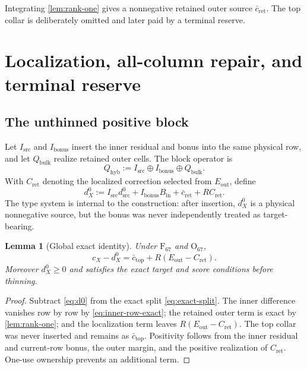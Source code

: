 \documentclass[11pt]{article}
\newtheorem{lemma}[theorem]{Lemma}
\theoremstyle{definition}
\theoremstyle{remark}
\newcommand{\1}{\mathbf 1}
\begin{document}
Integrating \cref{lem:rank-one} gives a nonnegative retained outer source \(\bar c_{\mathrm{ret}}\).  The top collar is deliberately omitted and later paid by a terminal reserve.

\section{Localization, all-column repair, and terminal reserve}\label{sec:localization}

\subsection{The unthinned positive block}

Let \(I_{\mathrm{src}}\) and \(I_{\mathrm{bonus}}\) insert the inner residual and bonus into the same physical row, and let \(Q_{\mathrm{bulk}}\) realize retained outer cells.  The block operator is
\begin{equation}\label{eq:Qhyb}
Q_{\mathrm{hyb}}:=I_{\mathrm{src}}\oplus I_{\mathrm{bonus}}\oplus Q_{\mathrm{bulk}}.
\end{equation}
With \(C_{\mathrm{ret}}\) denoting the localized correction selected from \(E_{\mathrm{out}}\), define
\begin{equation}\label{eq:d0}
d_X^0:=I_{\mathrm{src}}d_{\mathrm{src}}^0+I_{\mathrm{bonus}}B_{\mathrm{in}}
       +\bar c_{\mathrm{ret}}+RC_{\mathrm{ret}}.
\end{equation}
The type system is internal to the construction: after insertion, \(d_X^0\) is a physical nonnegative source, but the bonus was never independently treated as target-bearing.

\begin{lemma}[Global exact identity]\label{lem:global-exact}
Under \(\mathrm F_{67}\) and \(\mathrm O_{67}\),
\begin{equation}\label{eq:cminusd0}
\boxed{
c_X-d_X^0=\bar c_{\mathrm{top}}+R(E_{\mathrm{out}}-C_{\mathrm{ret}}).}
\end{equation}
Moreover \(d_X^0\ge0\) and satisfies the exact target and score conditions before thinning.
\end{lemma}

\begin{proof}
Subtract \eqref{eq:d0} from the exact split \eqref{eq:exact-split}.  The inner difference vanishes row by row by \eqref{eq:inner-row-exact}; the retained outer term is exact by \cref{lem:rank-one}; and the localization term leaves \(R(E_{\mathrm{out}}-C_{\mathrm{ret}})\).  The top collar was never inserted and remains as \(\bar c_{\mathrm{top}}\).  Positivity follows from the inner residual and current-row bonus, the outer margin, and the positive realization of \(C_{\mathrm{ret}}\).  One-use ownership prevents an additional term.
\end{proof}
\end{document}
